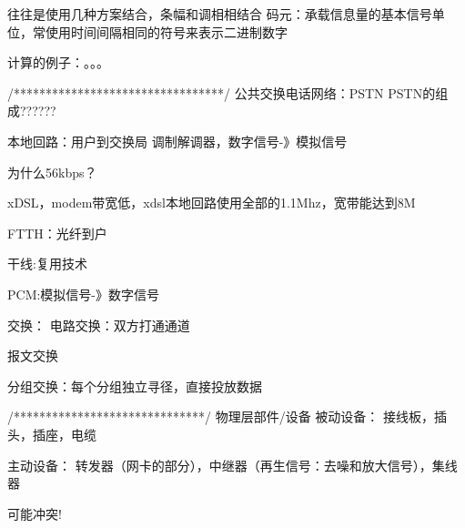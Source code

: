 \documentclass[UTF8,a4paper]{ctexart}
\begin{document}
往往是使用几种方案结合，条幅和调相相结合
码元：承载信息量的基本信号单位，常使用时间间隔相同的符号来表示二进制数字

计算的例子：。。。

/*********************************/
公共交换电话网络：PSTN
PSTN的组成??????

本地回路：用户到交换局
调制解调器，数字信号-》模拟信号

为什么56kbps？

xDSL，modem带宽低，xdsl本地回路使用全部的1.1Mhz，宽带能达到8M

FTTH：光纤到户

干线:复用技术

PCM:模拟信号-》数字信号

交换：
电路交换：双方打通通道

报文交换

分组交换：每个分组独立寻径，直接投放数据

/******************************/
物理层部件/设备
被动设备：
接线板，插头，插座，电缆

主动设备：
转发器（网卡的部分），中继器（再生信号：去噪和放大信号），集线器

可能冲突!
\end{document}
